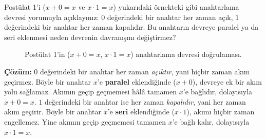 \begin{alistirma}[\kolay]
Postülat 1'i ($x+0=x$ ve $x\cdot 1=x$) yukarıdaki örnekteki gibi anahtarlama devresi
yorumuyla açıklayınız: $0$ değerindeki bir anahtar her zaman açık, $1$ değerindeki bir anahtar
her zaman kapalıdır. Bu anahtarın devreye paralel ya da seri eklenmesi neden devrenin
davranışını değiştirmez?
\end{alistirma}

\begin{figure}[H]
\centering
{}
\hspace{1.8cm}
\caption{Postülat 1'in ($x+0=x$, $x\cdot 1=x$) anahtarlama devresi doğrulaması.}
\label{fig:postulat1-devre}
\end{figure}

\noindent\textbf{Çözüm:} $0$ değerindeki bir anahtar her zaman \emph{açıktır}, yani hiçbir zaman
akım geçirmez. Böyle bir anahtar $x$'e \textbf{paralel} eklendiğinde ($x+0$), devreye ek bir
akım yolu sağlamaz. Akımın geçip geçmemesi hâlâ tamamen $x$'e bağlıdır, dolayısıyla
$x+0=x$. $1$ değerindeki bir anahtar ise her zaman \emph{kapalıdır}, yani her zaman akım
geçirir. Böyle bir anahtar $x$'e \textbf{seri} eklendiğinde ($x\cdot 1$), akımı hiçbir zaman
engellemez. Yine akımın geçip geçmemesi tamamen $x$'e bağlı kalır, dolayısıyla $x\cdot 1=x$.

